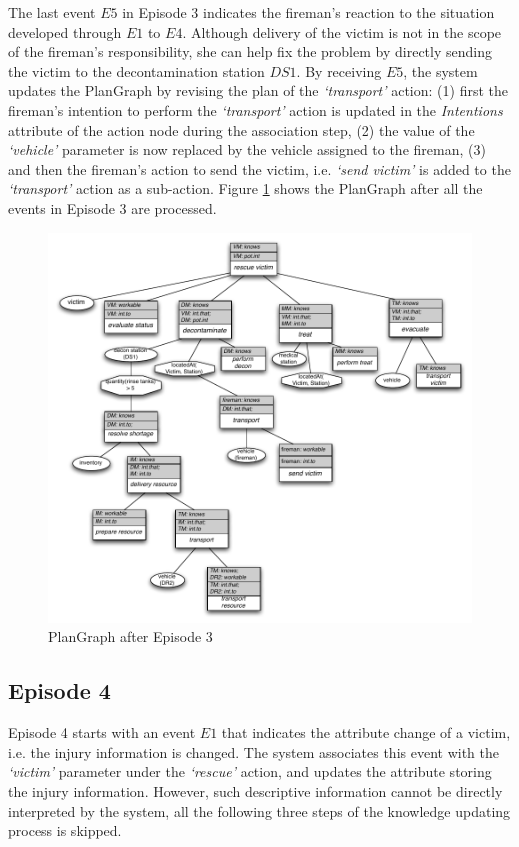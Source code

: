 The last event $E5$ in Episode 3 indicates the fireman's reaction to the situation developed through $E1$ to $E4$. Although delivery of the victim is not in the scope of the fireman's responsibility, she can help fix the problem by directly sending the victim to the decontamination station $DS1$. By receiving $E5$, the system updates the PlanGraph by revising the plan of the \emph{`transport'} action: (1) first the fireman's intention to perform the \emph{`transport'} action is updated in the \emph{Intentions} attribute of the action node during the association step, (2) the value of the \emph{`vehicle'} parameter is now replaced by the vehicle assigned to the fireman, (3) and then the fireman's action to send the victim, i.e. \emph{`send victim'} is added to the \emph{`transport'} action as a sub-action. Figure \ref{fig:plangraph_ep3} shows the PlanGraph after all the events in Episode 3 are processed.

\begin{figure}[htbp] %
	\centering
	\includegraphics[width=5.8in]{plangraph_ep3.pdf} 
	\caption{PlanGraph after Episode 3}
	\label{fig:plangraph_ep3}
\end{figure}

\subsection{Episode 4} %
\label{sub:episode_4}
Episode 4 starts with an event $E1$ that indicates the attribute change of a victim, i.e. the injury information is changed. The system associates this event with the \emph{`victim'} parameter under the \emph{`rescue'} action, and updates the attribute storing the injury information. However, such descriptive information cannot be directly interpreted by the system, all the following three steps of the knowledge updating process is skipped. 


